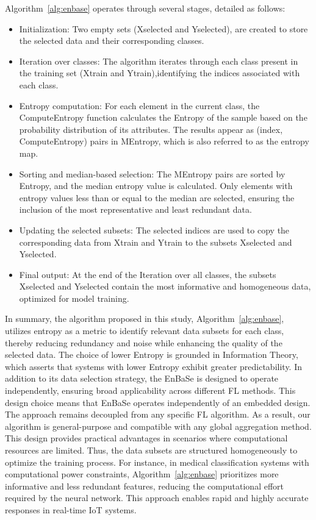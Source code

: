 \documentclass[11pt,a4paper]{article}
\begin{document}
Algorithm~\ref{alg:enbase} operates through several stages, detailed as follows:

\begin{itemize}
  \item Initialization: Two empty sets (Xselected and Yselected), are created to store the selected data and their corresponding classes.
  \item Iteration over classes: The algorithm iterates through each class present in the training set (Xtrain and Ytrain),identifying the indices associated with each class.
  \item Entropy computation: For each element in the current class, the ComputeEntropy function calculates the Entropy of the sample based on the probability distribution of its attributes. The results appear as (index, ComputeEntropy) pairs in MEntropy, which is also referred to as the entropy map.
  \item Sorting and median-based selection: The MEntropy pairs are sorted by Entropy, and the median entropy value is calculated. Only elements with entropy values less than or equal to the median are selected, ensuring the inclusion of the most representative and least redundant data.
  \item Updating the selected subsets: The selected indices are used to copy the corresponding data from Xtrain and Ytrain to the subsets Xselected and Yselected.
  \item Final output: At the end of the Iteration over all classes, the subsets Xselected and Yselected contain the most informative and homogeneous data, optimized for model training.
\end{itemize}

In summary, the algorithm proposed in this study, Algorithm~\ref{alg:enbase}, utilizes entropy as a metric to identify relevant data subsets for each class, thereby reducing redundancy and noise while enhancing the quality of the selected data.
The choice of lower Entropy is grounded in Information Theory, which asserts that systems with lower Entropy exhibit greater predictability.
In addition to its data selection strategy, the EnBaSe is designed to operate independently, ensuring broad applicability across different FL methods.
This design choice means that EnBaSe operates independently of an embedded design.
The approach remains decoupled from any specific FL algorithm.
As a result, our algorithm is general-purpose and compatible with any global aggregation method.
This design provides practical advantages in scenarios where computational resources are limited.
Thus, the data subsets are structured homogeneously to optimize the training process.
For instance, in medical classification systems with computational power constraints, Algorithm~\ref{alg:enbase} prioritizes more informative and less redundant features, reducing the computational effort required by the neural network. 
This approach enables rapid and highly accurate responses in real-time IoT systems.
\end{document}
